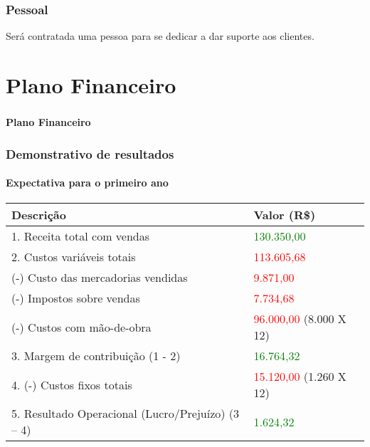 \documentclass{beamer}
\begin{document}
\begin{frame}
  \frametitle{Pessoal}
  
  Será contratada uma pessoa para se dedicar a dar suporte aos clientes.

\end{frame}

\section{Plano Financeiro}
\begin{frame}
  \frametitle{}
  \framesubtitle{}

  \begin{center}
    {\huge\textbf{Plano Financeiro}}
  \end{center}
\end{frame}

\begin{frame}
  \frametitle{Demonstrativo de resultados}
  \framesubtitle{Expectativa para o primeiro ano}
  
  \begin{small}
    \begin{tabular}{| l | l |}
      \hline
      \textbf{Descrição} & \textbf{Valor (R\$)}\\ \hline
      1. Receita total com vendas & \textcolor{green}{130.350,00}\\ \hline \hline
      2. Custos variáveis totais & \textcolor{red}{113.605,68}\\ \hline
      (-) Custo das mercadorias vendidas & \textcolor{red}{9.871,00}\\ \hline
      (-) Impostos sobre vendas & \textcolor{red}{7.734,68} \\ \hline
      (-) Custos com mão-de-obra & \textcolor{red}{96.000,00} (8.000 X 12)\\ \hline \hline
      3. Margem de contribuição (1 - 2) & \textcolor{green}{16.764,32}\\ \hline \hline
      4. (-) Custos fixos totais & \textcolor{red}{15.120,00} (1.260 X 12)\\ \hline \hline 
      5. Resultado Operacional (Lucro/Prejuízo) (3 – 4) & \textcolor{green}{1.624,32}\\ \hline
    \end{tabular}
  \end{small}
\end{frame}
\end{document}
